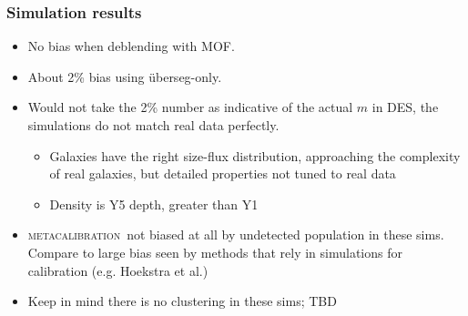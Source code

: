 \documentclass{beamer}
\newcommand{\mcal}{\textsc{metacalibration}}
\newcommand{\uberseg}{{\color{lightsteelblue} {\"u}berseg}}
\newcommand{\MOF}{{\color{brightred}MOF}}
\begin{document}
\frame
{

    \frametitle{Simulation results}


    \begin{itemize}

        \item No bias when deblending with \MOF.

        \item About 2\% bias using \uberseg-only.

        \item Would not take the 2\% number as indicative of the actual $m$ in
            DES, the simulations do not match real data perfectly.
            \begin{itemize}

                \item Galaxies have the right size-flux distribution,
                    approaching the complexity of real galaxies, but detailed
                    properties not tuned to real data

                \item Density is Y5 depth, greater than Y1

            \end{itemize}



        \item \mcal\ not biased at all by undetected population in these sims.
            Compare to large bias seen by methods that rely in simulations for
            calibration (e.g. Hoekstra et al.)

        \item Keep in mind there is no clustering in these sims; TBD

    \end{itemize}
}
\end{document}
